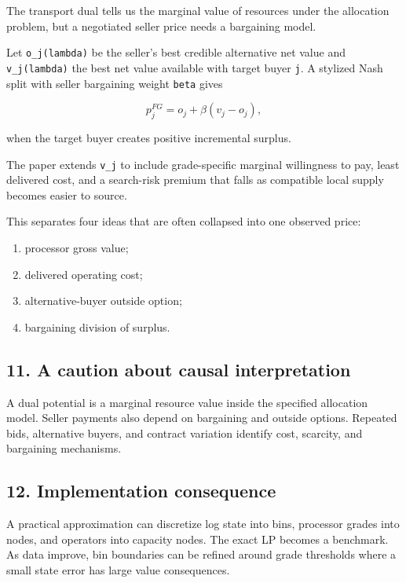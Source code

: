 The transport dual tells us the marginal value of resources under the allocation
problem, but a negotiated seller price needs a bargaining model.

Let \texttt{o\_j(lambda)} be the seller's best credible alternative net value and
\texttt{v\_j(lambda)} the best net value available with target buyer \texttt{j}. A stylized Nash
split with seller bargaining weight \texttt{beta} gives

\[
p_j^{FG}=o_j+\beta(v_j-o_j),
\]

when the target buyer creates positive incremental surplus.

The paper extends \texttt{v\_j} to include grade-specific marginal willingness to pay,
least delivered cost, and a search-risk premium that falls as compatible local
supply becomes easier to source.

This separates four ideas that are often collapsed into one observed price:

\begin{enumerate}
\def\labelenumi{\arabic{enumi}.}
\tightlist
\item
  processor gross value;
\item
  delivered operating cost;
\item
  alternative-buyer outside option;
\item
  bargaining division of surplus.
\end{enumerate}

\subsection{11. A caution about causal interpretation}\label{a-caution-about-causal-interpretation}

A dual potential is a marginal resource value inside the specified allocation
model. Seller payments also depend on bargaining and outside options. Repeated
bids, alternative buyers, and contract variation identify cost, scarcity, and
bargaining mechanisms.

\subsection{12. Implementation consequence}\label{implementation-consequence}

A practical approximation can discretize log state into bins, processor grades
into nodes, and operators into capacity nodes. The exact LP becomes a benchmark.
As data improve, bin boundaries can be refined around grade thresholds where a
small state error has large value consequences.
